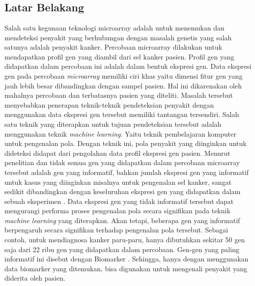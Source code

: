 \chapter{\babSatu}

\section{Latar Belakang}
Salah satu kegunaan teknologi microarray adalah untuk menemukan dan mendeteksi penyakit yang berhubungan dengan masalah genetis yang salah satunya adalah penyakit kanker. Percobaan microarray dilakukan untuk mendapatkan profil gen yang diambil dari sel kanker pasien. Profil gen yang didapatkan dalam percobaan ini adalah dalam bentuk ekspresi gen. Data ekspresi gen pada percobaan \textit{microarray} memiliki ciri khas yaitu dimensi fitur gen yang jauh lebih besar dibandingkan dengan sampel pasien. Hal ini dikarenakan oleh mahalnya percobaan dan terbatasnya pasien yang diteliti. Masalah tersebut menyebabkan penerapan teknik-teknik pendeteksian penyakit dengan menggunakan data ekspresi gen tersebut memiliki tantangan tersendiri. Salah satu teknik yang diterapkan untuk tujuan pendeteksian tersebut adalah menggunakan teknik \textit{machine learning}. Yaitu teknik pembelajaran komputer untuk pengenalan pola. Dengan teknik ini, pola penyakit yang diinginkan untuk dideteksi didapat dari pengolahan data profil ekspresi gen pasien. Menurut penelitian \cite{yoon2006building} dan \cite{bandyopadhyay2014survey} tidak semua gen yang didapatkan dalam percobaan microarray tersebut adalah gen yang informatif, bahkan jumlah ekspresi gen yang informatif untuk kasus yang diinginkan misalnya untuk pengenalan sel kanker, sangat sedikit dibandingkan dengan keseluruhan ekspresi gen yang didapatkan dalam sebuah eksperimen \citep{bandyopadhyay2014survey}. Data ekspresi gen yang tidak informatif tersebut dapat mengurangi performa  proses pengenalan pola secara signifikan pada teknik \textit{machine learning} yang diterapkan. Akan tetapi, beberapa gen yang informatif berpengaruh secara signifikan terhadap pengenalan pola tersebut. Sebagai contoh, untuk mendiagnosa kanker paru-paru, hanya dibutuhkan sekitar 50 gen saja dari 22 ribu gen yang didapatkan dalam percobaan. Gen-gen yang paling informatif ini disebut dengan Biomarker \citep{belinsky2004gene}. Sehingga, hanya dengan menggunakan data biomarker yang ditemukan, bisa digunakan untuk mengenali penyakit yang diderita oleh pasien.\\

